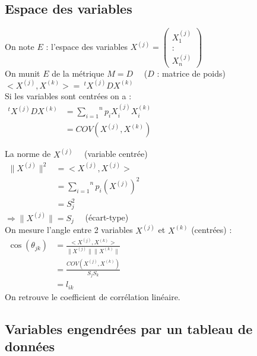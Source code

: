 \documentclass[a4paper, 12pt]{article}
\begin{document}
\subsection{Espace des variables}
\begin{flushleft}
On note $E$ : l'espace des variables
$
X^{(j)} =
\begin{pmatrix}
X^{(j)}_1 \\
: \\
X^{(j)}_n
\end{pmatrix}
$ \\
On munit $E$ de la métrique $M = D \quad$ ($D$ : matrice de poids) \\

$<X^{(j)}, X^{(k)}> = \ ^tX^{(j)} D X^{(k)}$ \\

Si les variables sont centrées on a : \\
$
\begin{aligned}
^t X^{(j)} D X^{(k)} &= \overset{n}{\underset{i = 1}{\sum}} p_i X^{(j)}_i X^{(k)}_i \\
&= COV (X^{(j)}, X^{(k)})
\end{aligned}
$

La norme de $X^{(j)} \quad$ (variable centrée) \\

$
\begin{aligned}
\|X^{(j)}\|^2 &= <X^{(j)}, X^{(j)}> \\
&= \overset{n}{\underset{i = 1}{\sum}} p_i \left (X^{(j)} \right )^2 \\
&= S^2_j
\end{aligned}
$ \\
$\Rightarrow \|X^{(j)}\| = S_j \quad$ (écart-type) \\
On mesure l'angle entre 2 variables $X^{(j)}$ et $X^{(k)}$ (centrées) : \\
$
\begin{aligned}
\cos (\theta_{jk}) &= \frac{<X^{(j)}, X^{(k)}>}{\|X^{(j)}\| \|X^{(k)}\|} \\
&= \frac{COV (X^{(j)}, X^{(k)})}{S_j S_k} \\
&= l_{ik}
\end{aligned}
$ \\
On retrouve le coefficient de corrélation linéaire.
\end{flushleft}


\subsection{Variables engendrées par un tableau de données}
\end{document}
